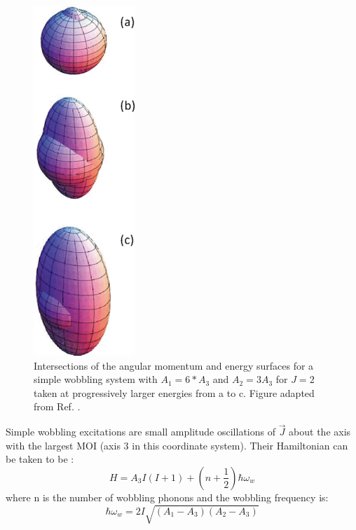 \begin{figure}[t!]
\centerline{\includegraphics[height=0.35\textheight]{./img/c2/simple_am_orbits.png}}
	\caption{Intersections of the angular momentum and energy surfaces for a simple wobbling system with $A_1=6*A_3$ and $A_2=3A_3$ for $J=2$ taken at progressively larger energies from a to c. Figure adapted from Ref. \cite{frauendorfTransverseWobbling}.\label{fig:chp2-classical-am-orbits}}
\end{figure}

Simple wobbling excitations are small amplitude oscillations of $\vec{J}$ about the axis with the largest MOI (axis 3 in this coordinate system). Their Hamiltonian can be taken to be \cite{frauendorfTransverseWobbling}:
\begin{equation}
\label{eqn:chp2-simple-wobb-hamil}
H=A_3I(I+1)+(n+\frac{1}{2})\hbar\omega_w
\end{equation}
where n is the number of wobbling phonons and the wobbling frequency is:
\begin{equation}
\label{eqn:chp2-simple-wobb-freq-theory}
\hbar\omega_w=2I\sqrt{(A_1-A_3)(A_2-A_3)}
\end{equation}

